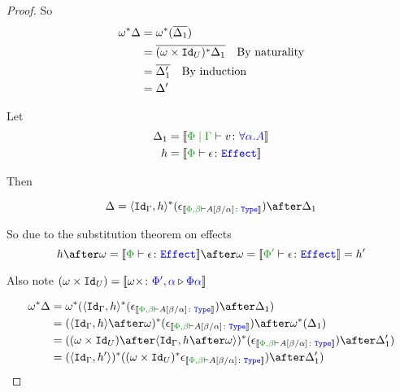 \documentclass{report}
\begin{document}
\begin{framed}
\begin{proof}
        So
        \begin{align*}
            \omega^*\Delta &= \omega^*(\overline{\Delta_1})\\
            & = \overline{(\omega\times\texttt{Id}_{U})^*\Delta_1}\quad\text{By naturality}\\
            & = \overline{\Delta_1'}\quad\text{By induction}\\
            & = \Delta'
        \end{align*}
        
        \case{\vspec}
        
        Let \begin{align*}
            \D_1 &= \deno{\gpetyperelation{v}{\all{\a}{A}}}\\
            h &= \deno{\typerelation{\P}{\e}{\effect}}\\
        \end{align*}
        
        Then
        
        \begin{equation}
            \D = \pr{\Id{\G}}{h}\star(\e_{\deno{\typerelation{\P,\b}{A\ssub{\a}{\b}}{\type}}})\after\D_1\\
        \end{equation}
        
        So due to the substitution theorem on effects
        \begin{equation}
            h\after\w = \deno{\typerelation{\P}{\e}{\effect}}\after\w = \deno{\typerelation{\P'}{\e}{\effect}} = h'
        \end{equation}
        
        Also note $(\omega\times\texttt{Id}_{U}) = {\bf [\![}\omega\times \colon {\color{blue}\Phi',\alpha} \triangleright {\color {blue} \Phi\alpha}{\bf ]\!]}$
        
        \begin{align*}
            \w\star{\D} & = \w\star(\pr{\Id{\G}}{h}\star(\e_{\deno{\typerelation{\P,\b}{A\ssub{\a}{\b}}{\type}}})\after\D_1)\\
            & = (\pr{\Id{\G}}{h}\after\w)\star(\e_{\deno{\typerelation{\P,\b}{A\ssub{\a}{\b}}{\type}}})\after\w\star(\D_1)\\
            & = ((\w\times\Id{U})\after\pr{\Id{\G}}{h\after\w})\star(\e_{\deno{\typerelation{\P,\b}{A\ssub{\a}{\b}}{\type}}})\after\D_1')\\
            & = (\pr{\Id{\G}}{h'})\star((\w\times\Id{U})\star\e_{\deno{\typerelation{\P,\b}{A\ssub{\a}{\b}}{\type}}})\after\D_1')\\
        \end{align*}
        

\end{proof}
\end{framed}
\end{document}
